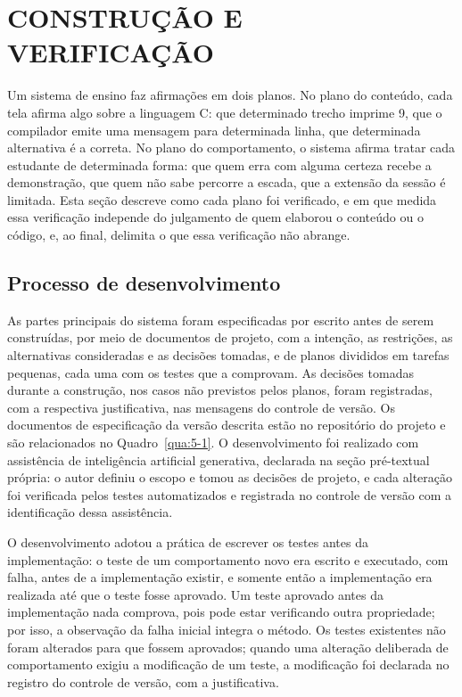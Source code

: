
\chapter{\texorpdfstring{\mbox{CONSTRUÇÃO} \mbox{E} \mbox{VERIFICAÇÃO}}{CONSTRUÇÃO E VERIFICAÇÃO}}\label{cap:5}

Um sistema de ensino faz afirmações em dois planos. No plano do conteúdo, cada tela afirma algo sobre a linguagem C: que determinado trecho imprime 9, que o compilador emite uma mensagem para determinada linha, que determinada alternativa é a correta. No plano do comportamento, o sistema afirma tratar cada estudante de determinada forma: que quem erra com alguma certeza recebe a demonstração, que quem não sabe percorre a escada, que a extensão da sessão é limitada. Esta seção descreve como cada plano foi verificado, e em que medida essa verificação independe do julgamento de quem elaborou o conteúdo ou o código, e, ao final, delimita o que essa verificação não abrange.

\section{Processo de desenvolvimento}

As partes principais do sistema foram especificadas por escrito antes de serem construídas, por meio de documentos de projeto, com a intenção, as restrições, as alternativas consideradas e as decisões tomadas, e de planos divididos em tarefas pequenas, cada uma com os testes que a comprovam. As decisões tomadas durante a construção, nos casos não previstos pelos planos, foram registradas, com a respectiva justificativa, nas mensagens do controle de versão. Os documentos de especificação da versão descrita estão no repositório do projeto e são relacionados no Quadro~\ref{qua:5-1}. O desenvolvimento foi realizado com assistência de inteligência artificial generativa, declarada na seção pré-textual própria: o autor definiu o escopo e tomou as decisões de projeto, e cada alteração foi verificada pelos testes automatizados e registrada no controle de versão com a identificação dessa assistência.

O desenvolvimento adotou a prática de escrever os testes antes da implementação: o teste de um comportamento novo era escrito e executado, com falha, antes de a implementação existir, e somente então a implementação era realizada até que o teste fosse aprovado. Um teste aprovado antes da implementação nada comprova, pois pode estar verificando outra propriedade; por isso, a observação da falha inicial integra o método. Os testes existentes não foram alterados para que fossem aprovados; quando uma alteração deliberada de comportamento exigiu a modificação de um teste, a modificação foi declarada no registro do controle de versão, com a justificativa.

